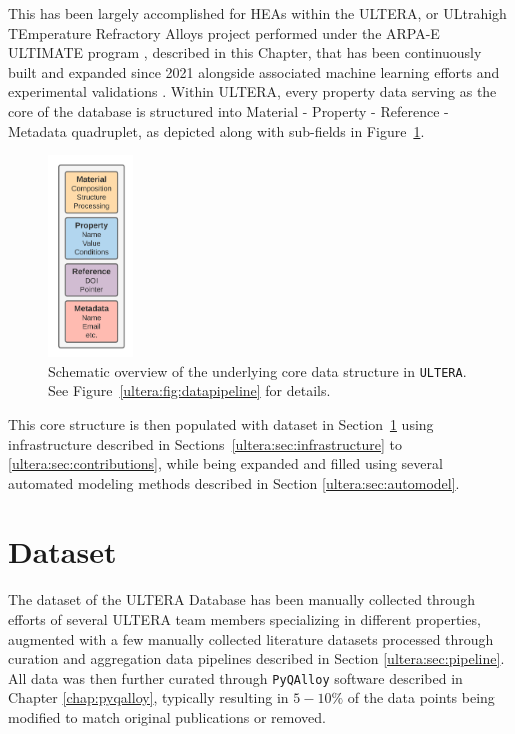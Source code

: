 This has been largely accomplished for HEAs within the ULTERA, or ULtrahigh TEmperature Refractory Alloys project performed under the ARPA-E ULTIMATE program \cite{ULTIMATEArpa-e.energy.gov}, described in this Chapter, that has been continuously built and expanded since 2021 \cite{Debnath2021GenerativeAlloys} alongside associated machine learning efforts \cite{Debnath2023ComparingAlloys} and experimental validations \cite{Li2024DesignExperiments}. Within ULTERA, every property data serving as the core of the database is structured into Material - Property - Reference - Metadata quadruplet, as depicted along with sub-fields in Figure~\ref{ultera:fig:material}.

\begin{figure}[H]
    \centering
    \includegraphics[width=0.2\textwidth]{ultera/ULTERADataDetail_material.png}
    \caption{Schematic overview of the underlying core data structure in \texttt{ULTERA}. See Figure~\ref{ultera:fig:datapipeline} for details.}
    \label{ultera:fig:material}
\end{figure}

This core structure is then populated with dataset in Section~\ref{ultera:sec:datadescription} using infrastructure described in Sections~\ref{ultera:sec:infrastructure} to \ref{ultera:sec:contributions}, while being expanded and filled using several automated modeling methods described in Section \ref{ultera:sec:automodel}.


\section{Dataset} \label{ultera:sec:datadescription}
\newcommand{\statisticstime}{April 2024}

The dataset of the ULTERA Database has been manually collected through efforts of several ULTERA team members specializing in different properties, augmented with a few manually collected literature datasets processed through curation and aggregation data pipelines described in Section \ref{ultera:sec:pipeline}. All data was then further curated through \texttt{PyQAlloy} software described in Chapter \ref{chap:pyqalloy}, typically resulting in $5-10\%$ of the data points being modified to match original publications or removed.

